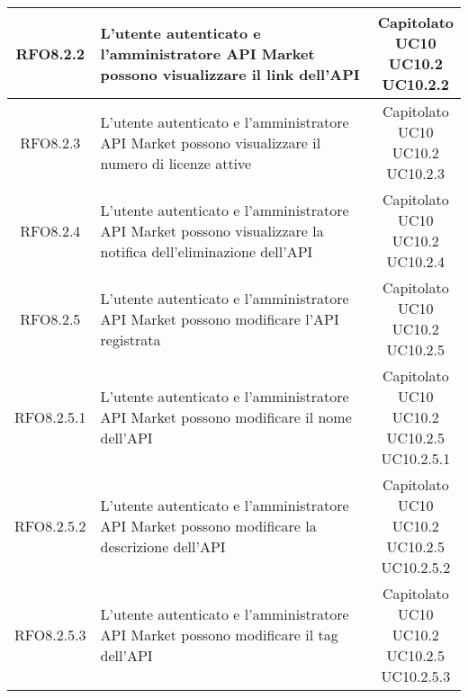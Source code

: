\begin{longtable}{|c|p{8cm}|c|}
RFO8.2.2 &  L'utente autenticato e l'amministratore API Market possono visualizzare il link dell'API & \makecell*{Capitolato\\UC10\\UC10.2\\UC10.2.2} \\
\hline

RFO8.2.3 &  L'utente autenticato e l'amministratore API Market possono visualizzare il numero di licenze attive & \makecell*{Capitolato\\UC10\\UC10.2\\UC10.2.3} \\
\hline

RFO8.2.4 &  L'utente autenticato e l'amministratore API Market possono visualizzare la notifica dell'eliminazione dell'API & \makecell*{Capitolato\\UC10\\UC10.2\\UC10.2.4} \\
\hline

RFO8.2.5 &  L'utente autenticato e l'amministratore API Market possono modificare l'API registrata & \makecell*{Capitolato\\UC10\\UC10.2\\UC10.2.5} \\
\hline

RFO8.2.5.1 &  L'utente autenticato e l'amministratore API Market possono modificare il nome dell'API & \makecell*{Capitolato\\UC10\\UC10.2\\UC10.2.5\\UC10.2.5.1} \\
\hline

RFO8.2.5.2 &  L'utente autenticato e l'amministratore API Market possono modificare la descrizione dell'API & \makecell*{Capitolato\\UC10\\UC10.2\\UC10.2.5\\UC10.2.5.2} \\
\hline

RFO8.2.5.3 &  L'utente autenticato e l'amministratore API Market possono modificare il tag dell'API & \makecell*{Capitolato\\UC10\\UC10.2\\UC10.2.5\\UC10.2.5.3} \\
\hline


\end{longtable}
